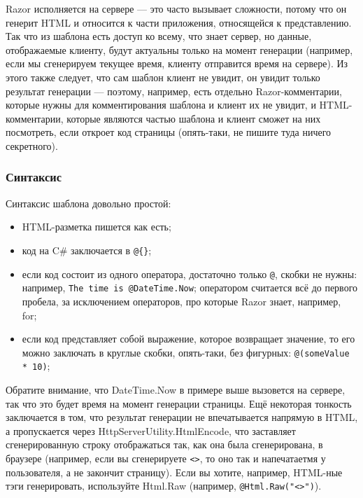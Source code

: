 \documentclass[a5paper]{article}
\begin{document}
Razor исполняется на сервере --- это часто вызывает сложности, потому что он генерит HTML и относится к части приложения, относящейся к представлению. Так что из шаблона есть доступ ко всему, что знает сервер, но данные, отображаемые клиенту, будут актуальны только на момент генерации (например, если мы сгенерируем текущее время, клиенту отправится время на сервере). Из этого также следует, что сам шаблон клиент не увидит, он увидит только результат генерации --- поэтому, например, есть отдельно Razor-комментарии, которые нужны для комментирования шаблона и клиент их не увидит, и HTML-комментарии, которые являются частью шаблона и клиент сможет на них посмотреть, если откроет код страницы (опять-таки, не пишите туда ничего секретного).

\subsubsection{Синтаксис}

Синтаксис шаблона довольно простой:

\begin{itemize}
    \item HTML-разметка пишется как есть;
    \item код на C\# заключается в \verb|@{}|;
    \item если код состоит из одного оператора, достаточно только \verb|@|, скобки не нужны: например, \texttt{The time is @DateTime.Now}; оператором считается всё до первого пробела, за исключением операторов, про которые Razor знает, например, for;
    \item если код представляет собой выражение, которое возвращает значение, то его можно заключать в круглые скобки, опять-таки, без фигурных: \texttt{@(someValue * 10)};
\end{itemize}

Обратите внимание, что DateTime.Now в примере выше вызовется на сервере, так что это будет время на момент генерации страницы. Ещё некоторая тонкость заключается в том, что результат генерации не впечатывается напрямую в HTML, а пропускается через HttpServerUtility.HtmlEncode, что заставляет сгенерированную строку отображаться так, как она была сгенерирована, в браузере (например, если вы сгенерируете \texttt{<\body>}, то оно так и напечатаетмя у пользователя, а не закончит страницу). Если вы хотите, например, HTML-ные тэги генерировать, используйте Html.Raw (например, \texttt{@Html.Raw("<\body>")}).
\end{document}
